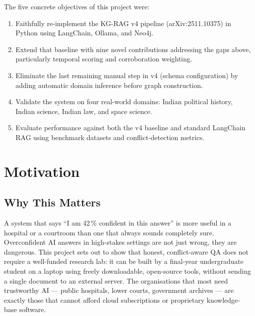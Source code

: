 The five concrete objectives of this project were:
\begin{enumerate}\itemsep0pt
    \item Faithfully re-implement the KG-RAG v4 pipeline (arXiv:2511.10375)
    in Python using LangChain, Ollama, and Neo4j.
    \item Extend that baseline with nine novel contributions addressing the
    gaps above, particularly temporal scoring and corroboration weighting.
    \item Eliminate the last remaining manual step in v4 (schema configuration)
    by adding automatic domain inference before graph construction.
    \item Validate the system on four real-world domains: Indian political
    history, Indian science, Indian law, and space science.
    \item Evaluate performance against both the v4 baseline and standard
    LangChain RAG using benchmark datasets and conflict-detection metrics.
\end{enumerate}

\section{Motivation}

\subsection{Why This Matters}

A system that says ``I am 42\,\% confident in this answer'' is more useful in
a hospital or a courtroom than one that always sounds completely sure.
Overconfident AI answers in high-stakes settings are not just wrong, they are
dangerous. This project sets out to show that honest, conflict-aware QA does
not require a well-funded research lab: it can be built by a final-year
undergraduate student on a laptop using freely downloadable, open-source tools,
without sending a single document to an external server. The organisations
that most need trustworthy AI — public hospitals, lower courts, government
archives — are exactly those that cannot afford cloud subscriptions or
proprietary knowledge-base software.



